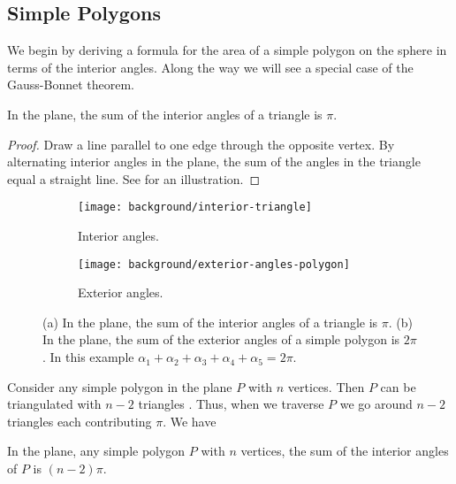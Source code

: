 \subsection{Simple Polygons}
\label{sec:warm-up}

We begin by deriving a formula for the area
of a simple polygon on the sphere in terms of the 
interior angles. Along the way we will see a special case
of the Gauss-Bonnet theorem.
\begin{theorem}\label{thm:triangle}
In the plane, the sum of the interior angles of a triangle is $\pi$.
\end{theorem}
\begin{proof}
Draw a line parallel to one edge through the opposite vertex.
By alternating interior angles in the plane, the sum of the angles
in the triangle equal a straight line.
See  for an illustration. 
\end{proof}


 \begin{figure}[htb]
         \centering
        \begin{subfigure}[b]{0.35\textwidth}
         \texttt{[image: background/interior-triangle]}
         \caption{Interior angles.}
 	 \label{fig:interior-angles}
       \end{subfigure}
         \hspace{1cm}
         \begin{subfigure}[b]{0.25\textwidth}
         \texttt{[image: background/exterior-angles-polygon]}
         \caption{Exterior angles.}
          \label{fig:exterior-angles}
         \end{subfigure}
		\caption{(a) In the plane, the sum of the interior angles of a triangle is $\pi$.
 		(b) In the plane, the sum of the exterior angles of a simple
		polygon is $2\pi$. In this example 
		$\alpha_1+\alpha_2+\alpha_3+\alpha_4+\alpha_5=2\pi$.
 		\label{fig:simple-polygon}}
 \end{figure}

Consider any simple polygon in the plane $P$ with $n$ vertices. 
Then $P$ can be triangulated with $n-2$ triangles \cite{orourke_computational_1994}.
Thus, when we traverse $P$ we go around $n-2$ triangles each contributing
$\pi$.
We have
\begin{corollary}\label{cor:angles}
In the plane, any simple polygon $P$ with $n$ vertices,
the sum of the interior angles of $P$ is $(n-2)\pi$.

\end{corollary}

